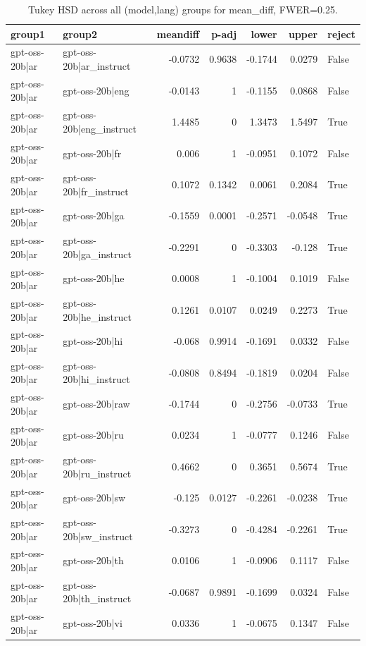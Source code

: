 \begin{table}
\caption{Tukey HSD across all (model,lang) groups for mean_diff, FWER=0.25.}
\label{tab:tukey_all_models_all_langs_mean_diff}
\begin{tabular}{l l r r r r l}
\toprule
group1 & group2 & meandiff & p-adj & lower & upper & reject \\
\midrule
gpt-oss-20b|ar & gpt-oss-20b|ar_instruct & -0.0732 & 0.9638 & -0.1744 & 0.0279 & False \\
gpt-oss-20b|ar & gpt-oss-20b|eng & -0.0143 & 1 & -0.1155 & 0.0868 & False \\
gpt-oss-20b|ar & gpt-oss-20b|eng_instruct & 1.4485 & 0 & 1.3473 & 1.5497 & True \\
gpt-oss-20b|ar & gpt-oss-20b|fr & 0.006 & 1 & -0.0951 & 0.1072 & False \\
gpt-oss-20b|ar & gpt-oss-20b|fr_instruct & 0.1072 & 0.1342 & 0.0061 & 0.2084 & True \\
gpt-oss-20b|ar & gpt-oss-20b|ga & -0.1559 & 0.0001 & -0.2571 & -0.0548 & True \\
gpt-oss-20b|ar & gpt-oss-20b|ga_instruct & -0.2291 & 0 & -0.3303 & -0.128 & True \\
gpt-oss-20b|ar & gpt-oss-20b|he & 0.0008 & 1 & -0.1004 & 0.1019 & False \\
gpt-oss-20b|ar & gpt-oss-20b|he_instruct & 0.1261 & 0.0107 & 0.0249 & 0.2273 & True \\
gpt-oss-20b|ar & gpt-oss-20b|hi & -0.068 & 0.9914 & -0.1691 & 0.0332 & False \\
gpt-oss-20b|ar & gpt-oss-20b|hi_instruct & -0.0808 & 0.8494 & -0.1819 & 0.0204 & False \\
gpt-oss-20b|ar & gpt-oss-20b|raw & -0.1744 & 0 & -0.2756 & -0.0733 & True \\
gpt-oss-20b|ar & gpt-oss-20b|ru & 0.0234 & 1 & -0.0777 & 0.1246 & False \\
gpt-oss-20b|ar & gpt-oss-20b|ru_instruct & 0.4662 & 0 & 0.3651 & 0.5674 & True \\
gpt-oss-20b|ar & gpt-oss-20b|sw & -0.125 & 0.0127 & -0.2261 & -0.0238 & True \\
gpt-oss-20b|ar & gpt-oss-20b|sw_instruct & -0.3273 & 0 & -0.4284 & -0.2261 & True \\
gpt-oss-20b|ar & gpt-oss-20b|th & 0.0106 & 1 & -0.0906 & 0.1117 & False \\
gpt-oss-20b|ar & gpt-oss-20b|th_instruct & -0.0687 & 0.9891 & -0.1699 & 0.0324 & False \\
gpt-oss-20b|ar & gpt-oss-20b|vi & 0.0336 & 1 & -0.0675 & 0.1347 & False \\

\end{tabular}
\end{table}
